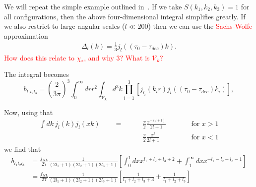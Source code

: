     We will repeat the simple example outlined in~\cite{FergShell_2}. If we
    take $S(k_1,k_2,k_3)=1$ for all configurations, then the above four-dimensional integral
    simplifies greatly. If we also restrict to large angular scales ($l\ll200$)
    then we can use the \textcolor{red}{Sachs-Wolfe} approximation
    \begin{align}
        \Delta_l(k) = \frac{1}{3}j_l((\tau_0-\tau_{dec})k).
    \end{align}
    \textcolor{red}{How does this relate to $\chi_*$, and why $3$? What is $\mathcal{V}_k$?}

    The integral becomes
    \begin{equation}
    \label{eq:reduced_cmb_constant}
    b_{l_1l_2l_3} = \left(\frac{2}{3\pi}\right)^3\int_{0}^{\infty}drr^2
        \int_{\mathcal{V}_k}d^3k \prod_{i=1}^{3}\left[j_{l_i}(k_ir)j_l((\tau_0-\tau_{dec})k_i)\right],
    \end{equation}


    Now, using that
    \begin{align}
        \int dk~j_l(k)j_l(xk)\qquad=\qquad&\frac{\pi}{2}\frac{x^{-(l+1)}}{2l+1}\qquad&&\text{for $x>1$}\\
                            \qquad&\frac{\pi}{2}\frac{x^{l}}{2l+1}\qquad&&\text{for $x<1$}
    \end{align}
    we find that
    \begin{align}
        b_{l_1l_2l_3} &= \frac{f_{NL}}{27}\frac{1}{(2l_1+1)(2l_2+1)(2l_3+1)}
        \left[\int^1_0dx x^{l_1+l_2+l_3+2}+\int^\infty_1dx x^{-l_1-l_2-l_3-1}\right]\\
                &= \frac{f_{NL}}{27}\frac{1}{(2l_1+1)(2l_2+1)(2l_3+1)}
        \left[\frac{1}{l_1+l_2+l_3+3}+\frac{1}{l_1+l_2+l_3}\right]
    \end{align}


